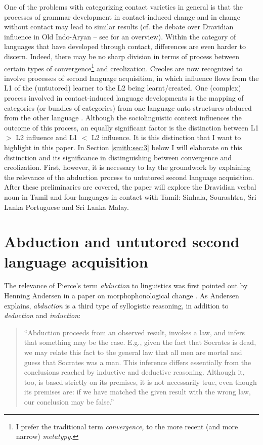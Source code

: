 One of the problems with categorizing contact varieties in general is that the processes of grammar development in contact-induced change and in change without contact may lead to similar results (cf. the debate over Dravidian influence in Old Indo-Aryan -- see \citet{Munkwitz1995} for an overview). Within the category of languages that have developed through contact, differences are even harder to discern. Indeed, there may be no sharp division in terms of process between certain types of convergence\footnote{I
 prefer the traditional term \textit{convergence,} to the more recent (and more narrow) \textit{metatypy}.
} 
and creolization. Creoles are now recognized to involve processes of second language acquisition, in which influence flows from the L1 of the (untutored) learner to the L2 being learnt/created. One (complex) process involved in contact-induced language developments is the mapping of categories (or bundles of categories) from one language onto structures abduced from the other language \citep{Smith1985dev}. Although the sociolinguistic context influences the outcome of this process, an equally significant factor is the distinction between L1 $>$ L2 influence and L1 $<$ L2 influence. It is this distinction that I want to highlight in this paper. In Section \ref{smith:sec:3} below I will elaborate on this distinction and its significance in distinguishing between convergence and creolization. First, however, it is necessary to lay the groundwork by explaining the relevance of the abduction process to untutored second language acquisition. After these preliminaries are covered, the paper will explore the Dravidian verbal noun in Tamil and four languages in contact with Tamil: Sinhala, Sourashtra, Sri Lanka Portuguese and Sri Lanka Malay.

\section[Abduction and second language acquisition]{Abduction and untutored second language acquisition}

The relevance of Pierce's term \textit{abduction} to linguistics was first pointed out by Henning Andersen in a paper on morphophonological change \citep{Andersen1973}. As Andersen explains, \textit{abduction }is a third type of syllogistic reasoning, in addition to \textit{deduction }and \textit{induction}:

\begin{quote}
 ``Abduction proceeds from an observed result, invokes a law, and infers that something may be the case. E.g., given the fact that Socrates is dead, we may relate this fact to the general law that all men are mortal and guess that Socrates was a man. This inference differs essentially from the conclusions reached by inductive and deductive reasoning. Although it, too, is based strictly on its premises, it is not necessarily true, even though its premises are: if we have matched the given result with the wrong law, our conclusion may be false.'' \citep[775]{Andersen1973}
\end{quote}

